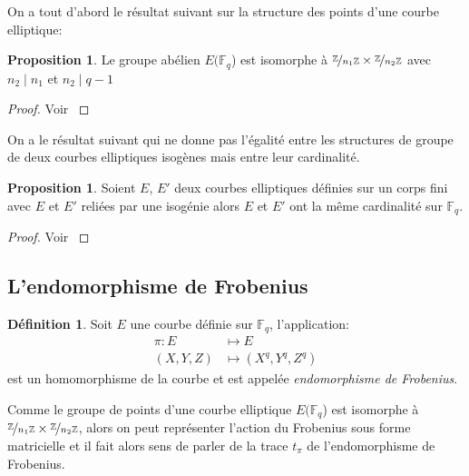 \documentclass[10pt,a4paper]{book}
\theoremstyle{plain}
\theoremstyle{definition}
\theoremstyle{definition}
\theoremstyle{definition}
\newtheorem{prop}[thm]{Proposition}
\theoremstyle{definition}
\newtheorem{defi}[thm]{Définition}
\theoremstyle{remark}
\theoremstyle{remark}
\theoremstyle{definition}
\begin{document}
On a tout d'abord le résultat suivant sur la structure des points d'une courbe elliptique:
\begin{prop}
Le groupe abélien $E(\mathbb{F}_q$) est isomorphe à $\nicefrac{\mathbb{Z}}{n_1 \mathbb{Z}} \times \nicefrac{\mathbb{Z}}{n_2 \mathbb{Z}}$ avec $n_2 \mid n_1$ et $n_2 \mid q-1$
\end{prop}

\begin{proof}
Voir \cite[Theorem 4.1]{Washington2008}
\end{proof}
On a le résultat suivant qui ne donne pas l'égalité entre les structures de groupe de deux courbes elliptiques isogènes mais entre leur cardinalité.

\begin{prop}
\label{pro:iso:ega}
Soient $E$, $E'$ deux courbes elliptiques définies sur un corps fini avec $E$ et $E'$ reliées par une isogénie alors $E$ et $E'$ ont la même cardinalité sur $\mathbb{F}_q$.
\end{prop}

\begin{proof}
Voir \cite[Exercise V.5.4.a]{Silv1}
\end{proof}

\subsection{L'endomorphisme de Frobenius}
\begin{defi}
Soit $E$ une courbe définie sur $\mathbb{F}_q$, l'application: 
\begin{equation*}
\begin{alignedat}{1}
\pi :E &\mapsto  E  \\
 (X,Y,Z)  &\mapsto (X^q,Y^q,Z^q)  
\end{alignedat}
\end{equation*}
est un homomorphisme de la courbe et est appelée \emph{endomorphisme de Frobenius}. 
\end{defi}

Comme le groupe de points d'une courbe elliptique  $E(\mathbb{F}_q$) est isomorphe à $\nicefrac{\mathbb{Z}}{n_1 \mathbb{Z}} \times \nicefrac{\mathbb{Z}}{n_2 \mathbb{Z}}$, alors on peut représenter l'action du Frobenius sous forme matricielle et il fait alors sens de parler de la trace $t_{\pi}$ de l'endomorphisme de Frobenius. 
\end{document}
